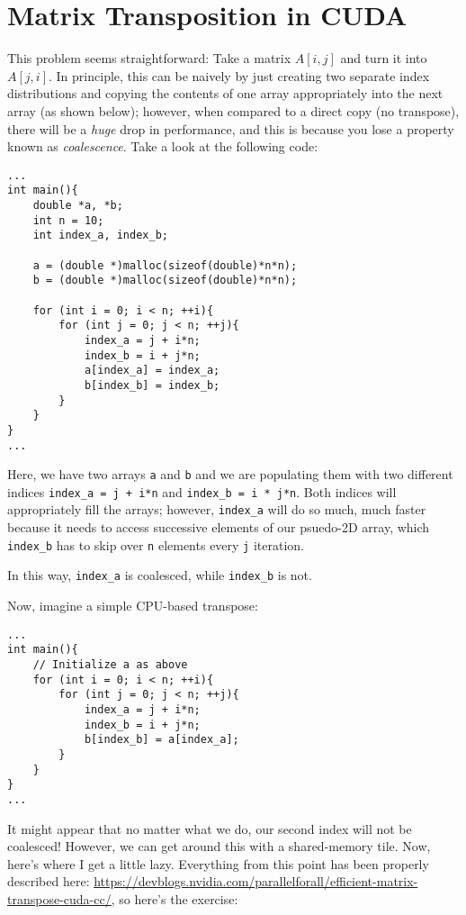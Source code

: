 \documentclass[11pt]{article}
\begin{document}
\newpage

\section*{Matrix Transposition in CUDA}

This problem seems straightforward: Take a matrix $A[i,j]$ and turn it into $A[j,i]$. In principle, this can be naively by just creating two separate index distributions and copying the contents of one array appropriately into the next array (as shown below); however, when compared to a direct copy (no transpose), there will be a \textit{huge} drop in performance, and this is because you lose a property known as \textit{coalescence}. Take a look at the following code:

\begin{lstlisting}
...
int main(){
    double *a, *b;
    int n = 10;
    int index_a, index_b;
    
    a = (double *)malloc(sizeof(double)*n*n);
    b = (double *)malloc(sizeof(double)*n*n);
    
    for (int i = 0; i < n; ++i){
        for (int j = 0; j < n; ++j){
            index_a = j + i*n;
            index_b = i + j*n;
            a[index_a] = index_a;
            b[index_b] = index_b;
        }
    }
}
...
\end{lstlisting}

Here, we have two arrays \lstinline{a} and \lstinline{b} and we are populating them with two different indices \lstinline{index_a = j + i*n} and \lstinline{index_b = i * j*n}. Both indices will appropriately fill the arrays; however, \lstinline{index_a} will do so much, much faster because it needs to access successive elements of our psuedo-2D array, which \lstinline{index_b} has to skip over \lstinline{n} elements every \lstinline{j} iteration.

In this way, \lstinline{index_a} is coalesced, while \lstinline{index_b} is not.

Now, imagine a simple CPU-based transpose:

\begin{lstlisting}
...
int main(){
    // Initialize a as above
    for (int i = 0; i < n; ++i){
        for (int j = 0; j < n; ++j){
            index_a = j + i*n;
            index_b = i + j*n;
            b[index_b] = a[index_a];
        }
    }
}
...
\end{lstlisting}

It might appear that no matter what we do, our second index will not be coalesced! However, we can get around this with a shared-memory tile. 
Now, here's where I get a little lazy. Everything from this point has been properly described here: \sloppy \url{https://devblogs.nvidia.com/parallelforall/efficient-matrix-transpose-cuda-cc/}, so here's the exercise:
\end{document}
